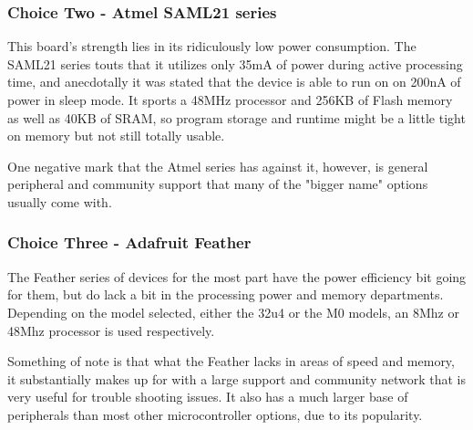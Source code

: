 \documentclass[onecolumn, draftclsnofoot,10pt, compsoc]{IEEEtran}
\begin{document}
    \subsubsection{Choice Two - Atmel SAML21 series}
    This board's strength lies in its ridiculously low power consumption.
    The SAML21 series touts that it utilizes only 35mA of power during active processing time\cite{digikey_saml21}, and anecdotally it was stated that the device is able to run on on 200nA of power in sleep mode.\cite{atmel_anecdote}
    It sports a 48MHz processor and 256KB of Flash memory as well as 40KB of SRAM, so program storage and runtime might be a little tight on memory but not still totally usable.\par
    One negative mark that the Atmel series has against it, however, is general peripheral and community support that many of the "bigger name" options usually come with.
    \subsubsection{Choice Three - Adafruit Feather}
    The Feather series of devices for the most part have the power efficiency bit going for them, but do lack a bit in the processing power and memory departments.
    Depending on the model selected, either the 32u4 or the M0 models, an 8Mhz or 48Mhz processor is used respectively.\par
    Something of note is that what the Feather lacks in areas of speed and memory, it substantially makes up for with a large support and community network that is very useful for trouble shooting issues.
    It also has a much larger base of peripherals than most other microcontroller options, due to its popularity.
    
\end{document}
